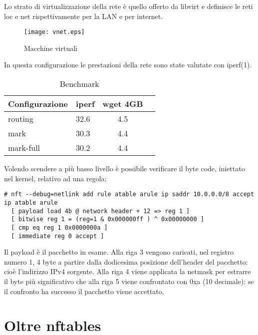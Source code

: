 Lo strato di virtualizzazione della rete \`e quello offerto da libvirt e
definisce le reti loc e net rispettivamente per la LAN e per internet.
\begin{figure}[H]
\begin{center}
      \texttt{[image: vnet.eps]}
      \caption{Macchine virtuali}
      \label{fig:vnet}
\end{center}
\end{figure}
In questa configurazione le prestazioni della rete sono state valutate con iperf(1).
\begin{center}
  \label{tab:benchmark}
  \begin{table}[ht]
    \centering %
     \begin{tabular}{@{}llcc@{}}
     \toprule
     {\bf Configurazione} & {\bf iperf} & {\bf wget 4GB} \\ \midrule
         routing  & 32.6                & 4.5 \\
         mark     & 30.3                & 4.4 \\ 
         mark-full& 30.2                & 4.4 \\ \bottomrule
      \end{tabular}  
    \caption{Benchmark} %
  \end{table}
\end{center}
Volendo scendere a pi\`u basso livello \`e possibile verificare il byte code,
iniettato nel kernel, relativo ad una regola:
\begin{lstlisting}[style=customc]
# nft --debug=netlink add rule atable arule ip saddr 10.0.0.0/8 accept            
ip atable arule
  [ payload load 4b @ network header + 12 => reg 1 ]
  [ bitwise reg 1 = (reg=1 & 0x000000ff ) ^ 0x00000000 ]
  [ cmp eq reg 1 0x0000000a ]
  [ immediate reg 0 accept ]
\end{lstlisting}
Il payload \`e il pacchetto in esame. Alla riga 3 vengono caricati, nel
registro numero 1, 4 byte a partire dalla dodicesima posizione dell'header del
pacchetto: cio\`e l'indirizzo IPv4 sorgente. Alla riga 4 viene applicata la
netmask per estrarre il byte pi\`u significativo che alla riga 5 viene
confrontato con 0xa (10 decimale): se il confronto ha successo il pacchetto
viene accettato.

\chapter{Oltre nftables}

